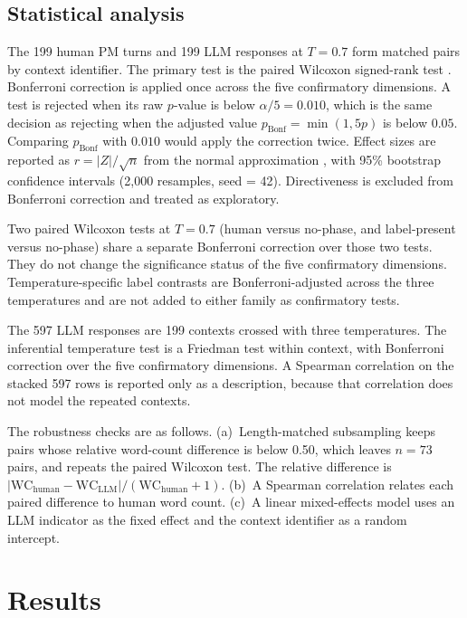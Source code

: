 \documentclass[11pt]{article}
\begin{document}
\subsection{Statistical analysis}
\label{sec:stats}
The 199 human PM turns and 199 LLM responses at $T = 0.7$ form matched pairs by context identifier. The primary test is the paired Wilcoxon signed-rank test \citep{wilcoxon1945}. Bonferroni correction is applied once across the five confirmatory dimensions. A test is rejected when its raw $p$-value is below $\alpha/5 = 0.010$, which is the same decision as rejecting when the adjusted value $p_\text{Bonf} = \min(1, 5p)$ is below $0.05$. Comparing $p_\text{Bonf}$ with $0.010$ would apply the correction twice. Effect sizes are reported as $r = |Z|/\sqrt{n}$ from the normal approximation \citep{rosenthal1994parametric}, with 95\% bootstrap confidence intervals (2{,}000 resamples, seed = 42). Directiveness is excluded from Bonferroni correction and treated as exploratory.

Two paired Wilcoxon tests at $T = 0.7$ (human versus no-phase, and label-present versus no-phase) share a separate Bonferroni correction over those two tests. They do not change the significance status of the five confirmatory dimensions. Temperature-specific label contrasts are Bonferroni-adjusted across the three temperatures and are not added to either family as confirmatory tests.

The 597 LLM responses are 199 contexts crossed with three temperatures. The inferential temperature test is a Friedman test within context, with Bonferroni correction over the five confirmatory dimensions. A Spearman correlation on the stacked 597 rows is reported only as a description, because that correlation does not model the repeated contexts.

The robustness checks are as follows. (a)~Length-matched subsampling keeps pairs whose relative word-count difference is below 0.50, which leaves $n = 73$ pairs, and repeats the paired Wilcoxon test. The relative difference is $|\mathrm{WC}_{\mathrm{human}} - \mathrm{WC}_{\mathrm{LLM}}| / (\mathrm{WC}_{\mathrm{human}} + 1)$. (b)~A Spearman correlation relates each paired difference to human word count. (c)~A linear mixed-effects model uses an LLM indicator as the fixed effect and the context identifier as a random intercept.

\section{Results}
\label{sec:results}
\end{document}
